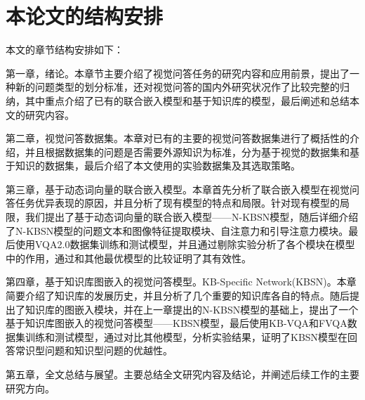 \section{本论文的结构安排}
本文的章节结构安排如下：

第一章，绪论。本章节主要介绍了视觉问答任务的研究内容和应用前景，提出了一种新的问题类型的划分标准，还对视觉问答的国内外研究状况作了比较完整的归纳，其中重点介绍了已有的联合嵌入模型和基于知识库的模型，最后阐述和总结本文的研究内容。

第二章，视觉问答数据集。本章对已有的主要的视觉问答数据集进行了概括性的介绍，并且根据数据集的问题是否需要外源知识为标准，分为基于视觉的数据集和基于知识的数据集，最后介绍了本文使用的实验数据集及其选取策略。

第三章，基于动态词向量的联合嵌入模型。本章首先分析了联合嵌入模型在视觉问答任务优异表现的原因，并且分析了现有模型的特点和局限。针对现有模型的局限，我们提出了基于动态词向量的联合嵌入模型——N-KBSN模型，随后详细介绍了N-KBSN模型的问题文本和图像特征提取模块、自注意力和引导注意力模块。最后使用VQA2.0数据集训练和测试模型，并且通过剔除实验分析了各个模块在模型中的作用，通过和其他最优模型的比较证明了其有效性。

第四章，基于知识库图嵌入的视觉问答模型。KB-Specific Network(KBSN)。本章简要介绍了知识库的发展历史，并且分析了几个重要的知识库各自的特点。随后提出了知识库的图嵌入模块，并在上一章提出的N-KBSN模型的基础上，提出了一个基于知识库图嵌入的视觉问答模型——KBSN模型，最后使用KB-VQA和FVQA数据集训练和测试模型，通过对比其他模型，分析实验结果，证明了KBSN模型在回答常识型问题和知识型问题的优越性。

第五章，全文总结与展望。主要总结全文研究内容及结论，并阐述后续工作的主要研究方向。